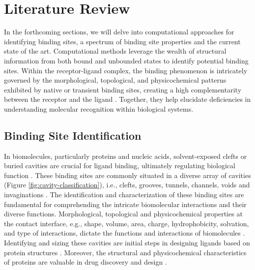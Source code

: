 \documentclass[Ingles]{phdthesis}
\def\ie{i.e.\onedot}
\def\eg{e.g.\onedot}
\begin{document}

\chapter{Literature Review}

In the forthcoming sections, we will delve into computational approaches for identifying binding sites, a spectrum of binding site properties and the current state of the art. Computational methods leverage the wealth of structural information from both bound and unbounded states to identify potential binding sites. Within the receptor-ligand complex, the binding phenomenon is intricately governed by the morphological, topological, and physicochemical patterns exhibited by native or transient binding sites, creating a high complementarity between the receptor and the ligand \cite{holyoak2013,sotriffer2002,henrich2010,guerra2019}. Together, they help elucidate deficiencies in understanding molecular recognition within biological systems.

\section{Binding Site Identification \label{sec:cavity-detection}}

In biomolecules, particularly proteins and nucleic acids, solvent-exposed clefts or buried cavities are crucial for ligand binding, ultimately regulating biological function \cite{liang1998,sotriffer2002,henrich2010}. These binding sites are commonly situated in a diverse array of cavities (Figure \ref{fig:cavity-classification}), \ie, clefts, grooves, tunnels, channels, voids and invaginations \cite{simoes2017,guerra2019}. The identification and characterization of these binding sites are fundamental for comprehending the intricate biomolecular interactions and their diverse functions. Morphological, topological and physicochemical properties at the contact interface, \eg, shape, volume, area, charge, hydrophobicity, solvation, and type of interactions, dictate the functions and interactions of biomolecules \cite{hubbard1994,bohacek1997,sotriffer2002,henrich2010,guerra2019}. Identifying and sizing these cavities are initial steps in designing ligands based on protein structures \cite{liang1998}. Moreover, the structural and physicochemical characteristics of proteins are valuable in drug discovery and design \cite{guerra2019}.
\end{document}
